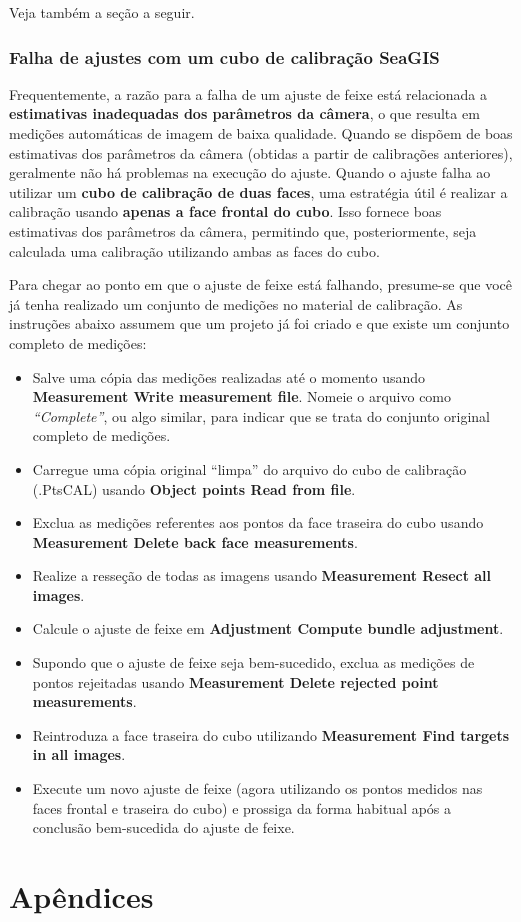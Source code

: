 \documentclass[
  12pt,
  letterpaper,
  DIV=11,
  numbers=noendperiod]{scrreprt}
\begin{document}
Veja também a seção a seguir.

\subsection{Falha de ajustes com um cubo de calibração
SeaGIS}\label{falha-de-ajustes-com-um-cubo-de-calibrauxe7uxe3o-seagis}

Frequentemente, a razão para a falha de um ajuste de feixe está
relacionada a \textbf{estimativas inadequadas dos parâmetros da câmera},
o que resulta em medições automáticas de imagem de baixa qualidade.
Quando se dispõem de boas estimativas dos parâmetros da câmera (obtidas
a partir de calibrações anteriores), geralmente não há problemas na
execução do ajuste. Quando o ajuste falha ao utilizar um \textbf{cubo de
calibração de duas faces}, uma estratégia útil é realizar a calibração
usando \textbf{apenas a face frontal do cubo}. Isso fornece boas
estimativas dos parâmetros da câmera, permitindo que, posteriormente,
seja calculada uma calibração utilizando ambas as faces do cubo.

Para chegar ao ponto em que o ajuste de feixe está falhando, presume-se
que você já tenha realizado um conjunto de medições no material de
calibração. As instruções abaixo assumem que um projeto já foi criado e
que existe um conjunto completo de medições:

\begin{itemize}
\item
  Salve uma cópia das medições realizadas até o momento usando
  \textbf{Measurement \textbar{} Write measurement file}. Nomeie o
  arquivo como \emph{``Complete''}, ou algo similar, para indicar que se
  trata do conjunto original completo de medições.
\item
  Carregue uma cópia original ``limpa'' do arquivo do cubo de calibração
  (.PtsCAL) usando \textbf{Object points \textbar{} Read from file}.
\item
  Exclua as medições referentes aos pontos da face traseira do cubo
  usando \textbf{Measurement \textbar{} Delete back face measurements}.
\item
  Realize a resseção de todas as imagens usando \textbf{Measurement
  \textbar{} Resect all images}.
\item
  Calcule o ajuste de feixe em \textbf{Adjustment \textbar{} Compute
  bundle adjustment}.
\item
  Supondo que o ajuste de feixe seja bem-sucedido, exclua as medições de
  pontos rejeitadas usando \textbf{Measurement \textbar{} Delete
  rejected point measurements}.
\item
  Reintroduza a face traseira do cubo utilizando \textbf{Measurement
  \textbar{} Find targets in all images}.
\item
  Execute um novo ajuste de feixe (agora utilizando os pontos medidos
  nas faces frontal e traseira do cubo) e prossiga da forma habitual
  após a conclusão bem-sucedida do ajuste de feixe.
\end{itemize}

\chapter{Apêndices}\label{apuxeandices-1}
\end{document}
